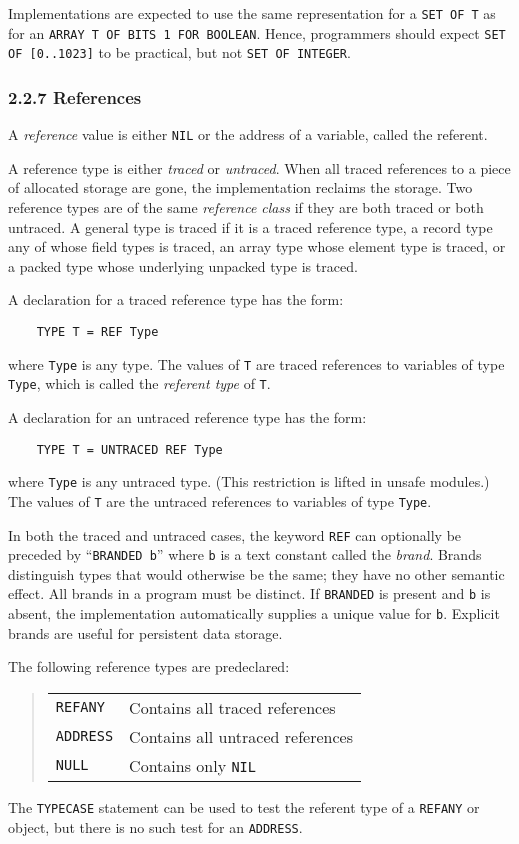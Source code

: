\documentclass[10pt]{article}
\begin{document}
Implementations are expected to use the same representation for a
\verb|SET OF T| as for an \texttt{ARRAY T OF BITS 1 FOR BOOLEAN}.  Hence,
programmers should expect \verb|SET OF [0..1023]| to be practical, but not
\verb|SET OF INTEGER|.

\subsubsection*{2.2.7 References}

A \emph{reference} value is either \verb|NIL| or the address of a variable,
called the referent.

A reference type is either \emph{traced} or \emph{untraced}.  When all traced
references to a piece of allocated storage are gone, the implementation
reclaims the storage.  Two reference types are of the same \emph{reference
  class} if they are both traced or both untraced.  A general type is traced
if it is a traced reference type, a record type any of whose field types is
traced, an array type whose element type is traced, or a packed type whose
underlying unpacked type is traced.

A declaration for a traced reference type has the form:
\begin{verbatim}
    TYPE T = REF Type
\end{verbatim}
where \verb|Type| is any type.  The values of \verb|T| are traced references
to variables of type \verb|Type|, which is called the \emph{referent type} of
\verb|T|.

A declaration for an untraced reference type has the form:
\begin{verbatim}
    TYPE T = UNTRACED REF Type
\end{verbatim}
where \verb|Type| is any untraced type.  (This restriction is lifted in unsafe
modules.) The values of \verb|T| are the untraced references to variables of
type \verb|Type|.

In both the traced and untraced cases, the keyword \verb|REF| can optionally
be preceded by ``\verb|BRANDED b|'' where \verb|b| is a text constant called
the \emph{brand}.  Brands distinguish types that would otherwise be the same;
they have no other semantic effect.  All brands in a program must be distinct.
If \verb|BRANDED| is present and \verb|b| is absent, the implementation
automatically supplies a unique value for \verb|b|.  Explicit brands are
useful for persistent data storage.

The following reference types are predeclared:
\begin{quote}
  \begin{tabular}{ll}
    \verb|REFANY|  & Contains all traced references \\
    \verb|ADDRESS| & Contains all untraced references \\
    \verb|NULL|    & Contains only \verb|NIL| \\
  \end{tabular}
\end{quote}
The \verb|TYPECASE| statement can be used to test the referent type of a
\verb|REFANY| or object, but there is no such test for an \verb|ADDRESS|.
\end{document}
